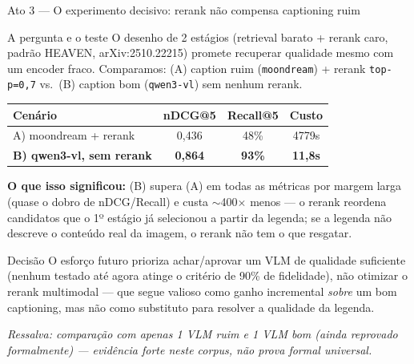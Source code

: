 \documentclass{beamer}
\newenvironment{numerobloco}[1]{\begin{block}{#1}}{\end{block}}
\newenvironment{decisaobloco}[1]{\begin{alertblock}{#1}}{\end{alertblock}}
\begin{document}
\begin{frame}{Ato 3 --- O experimento decisivo: rerank não compensa captioning ruim}
  \small
  \begin{numerobloco}{A pergunta e o teste}
    O desenho de 2 estágios (retrieval barato + rerank caro, padrão HEAVEN,
    arXiv:2510.22215) promete recuperar qualidade mesmo com um encoder fraco.
    Comparamos: (A) caption ruim (\texttt{moondream}) + rerank \texttt{top-p=0,7} vs.\
    (B) caption bom (\texttt{qwen3-vl}) sem nenhum rerank.
    \begin{center}
    \footnotesize
    \begin{tabular}{lccc}
      \toprule
      \textbf{Cenário} & \textbf{nDCG@5} & \textbf{Recall@5} & \textbf{Custo} \\
      \midrule
      A) moondream + rerank & 0,436 & 48\% & 4779s \\
      \textbf{B) qwen3-vl, sem rerank} & \textbf{0,864} & \textbf{93\%} & \textbf{11,8s} \\
      \bottomrule
    \end{tabular}
    \end{center}
  \end{numerobloco}

  \pause
  \textbf{O que isso significou:} (B) supera (A) em todas as métricas por margem larga
  (quase o dobro de nDCG/Recall) e custa \alert{$\sim$400$\times$ menos} --- o rerank
  reordena candidatos que o 1º estágio já selecionou a partir da legenda; se a legenda
  não descreve o conteúdo real da imagem, o rerank não tem o que resgatar.

  \pause
  \begin{decisaobloco}{Decisão}
    O esforço futuro prioriza achar/aprovar um VLM de qualidade suficiente (nenhum
    testado até agora atinge o critério de 90\% de fidelidade), não otimizar o rerank
    multimodal --- que segue valioso como ganho incremental \emph{sobre} um bom
    captioning, mas não como substituto para resolver a qualidade da legenda.
  \end{decisaobloco}

  \pause
  \footnotesize \textit{Ressalva: comparação com apenas 1 VLM ruim e 1 VLM bom (ainda
  reprovado formalmente) --- evidência forte neste corpus, não prova formal universal.}
\end{frame}
\end{document}
